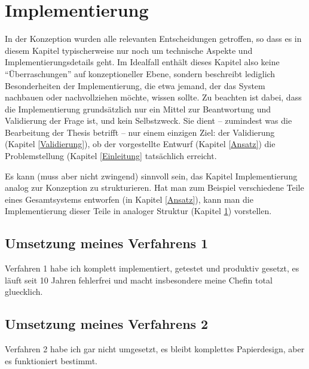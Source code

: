 \chapter{Implementierung}
\label{Implementierung}

In der Konzeption wurden alle relevanten Entscheidungen getroffen, so
dass es in diesem Kapitel typischerweise nur noch um technische
Aspekte und Implementierungsdetails geht. Im Idealfall enthält dieses
Kapitel also keine ``Überraschungen'' auf konzeptioneller Ebene,
sondern beschreibt lediglich Besonderheiten der Implementierung, die
etwa jemand, der das System nachbauen oder nachvollziehen möchte,
wissen sollte. Zu beachten ist dabei, dass die Implementierung
grundsätzlich nur ein Mittel zur Beantwortung und Validierung der
Frage ist, und kein Selbstzweck. Sie dient – zumindest was die
Bearbeitung der Thesis betrifft – nur einem einzigen Ziel: der
Validierung (Kapitel \ref{Validierung}), ob der vorgestellte Entwurf
(Kapitel \ref{Ansatz}) die Problemstellung (Kapitel \ref{Einleitung}
tatsächlich erreicht.

Es kann (muss aber nicht zwingend) sinnvoll sein, das Kapitel
Implementierung analog zur Konzeption zu strukturieren. Hat man zum
Beispiel verschiedene Teile eines Gesamtsystems entworfen (in Kapitel
\ref{Ansatz}), kann man die Implementierung dieser Teile in analoger
Struktur (Kapitel \ref{Implementierung}) vorstellen.

\section{Umsetzung meines Verfahrens 1}
\label{MeinsImplementierung1}

Verfahren 1 habe ich komplett implementiert, getestet und produktiv
gesetzt, es läuft seit 10 Jahren fehlerfrei und macht insbesondere
meine Chefin total gluecklich.

\section{Umsetzung meines Verfahrens 2}
\label{Meins2Implementierung}

Verfahren 2 habe ich gar nicht umgesetzt, es bleibt komplettes
Papierdesign, aber es funktioniert bestimmt.
